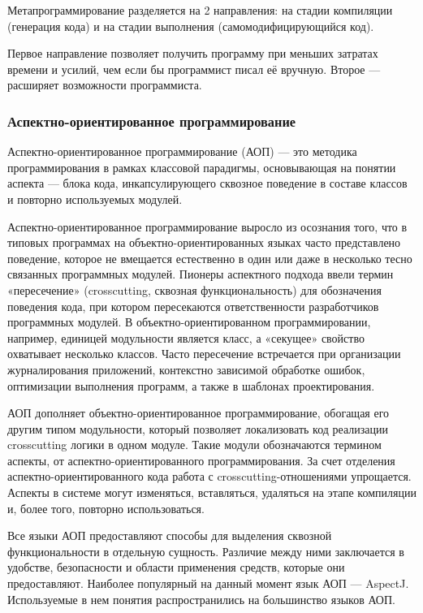 \documentclass[a4paper,12pt]{article}
\begin{document}
Метапрограммирование разделяется на 2 направления: на стадии
компиляции (генерация кода) и на стадии выполнения (самомодифицирующийся код).

Первое направление позволяет получить программу при меньших затратах времени и
усилий, чем если бы программист писал её вручную. Второе — расширяет
возможности программиста.

\subsubsection*{Аспектно-ориентированное программирование}
\label{aop}
Аспектно-ориентированное программирование (АОП) — это методика программирования
в рамках классовой парадигмы, основывающая на понятии аспекта — блока кода,
инкапсулирующего сквозное поведение в составе классов и повторно используемых
модулей.

Аспектно-ориентированное программирование выросло из осознания того, что в
типовых программах на объектно-ориентированных языках часто представлено
поведение, которое не вмещается естественно в один или даже в несколько тесно
связанных программных модулей. Пионеры аспектного подхода ввели термин
«пересечение» (crosscutting, сквозная функциональность) для обозначения
поведения кода, при котором пересекаются ответственности разработчиков
программных модулей. В объектно-ориентированном программировании, например,
единицей модульности является класс, а «секущее» свойство охватывает несколько
классов. Часто пересечение встречается при организации журналирования
приложений, контекстно зависимой обработке ошибок, оптимизации выполнения
программ, а также в шаблонах проектирования.

АОП дополняет объектно-ориентированное программирование, обогащая его другим
типом модульности, который позволяет локализовать код реализации crosscutting
логики в одном модуле. Такие модули обозначаются термином аспекты, от
аспектно-ориентированного программирования. За счет отделения
аспектно-ориентированного кода работа с crosscutting-отношениями упрощается.
Аспекты в системе могут изменяться, вставляться, удаляться на этапе компиляции
и, более того, повторно использоваться.

Все языки АОП предоставляют способы для выделения сквозной функциональности в
отдельную сущность. Различие между ними заключается в удобстве, безопасности и
области применения средств, которые они предоставляют. Наиболее популярный на
данный момент язык АОП — AspectJ. Используемые в нем понятия распространились
на большинство языков АОП.
\end{document}
